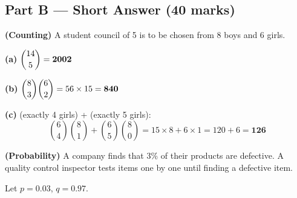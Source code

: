 \documentclass[addpoints]{exam}
\begin{document}
\begin{questions}
\section*{Part B --- Short Answer (40 marks)}

\question \textbf{(Counting)} A student council of 5 is to be chosen from 8 boys and 6 girls.
\begin{solution}[9cm]
\textbf{(a)} $\dbinom{14}{5} = \mathbf{2002}$

\textbf{(b)} $\dbinom{8}{3}\dbinom{6}{2} = 56 \times 15 = \mathbf{840}$

\textbf{(c)} (exactly 4 girls) + (exactly 5 girls):
\[
\binom{6}{4}\binom{8}{1} + \binom{6}{5}\binom{8}{0}
= 15 \times 8 + 6 \times 1 = 120 + 6 = \mathbf{126}
\]
\end{solution}

\question \textbf{(Probability)} A company finds that 3\% of their products are defective.
A quality control inspector tests items one by one until finding a defective item.
\begin{solution}[8cm]
Let $p = 0.03$, $q = 0.97$.


\end{solution}
\end{questions}
\end{document}
